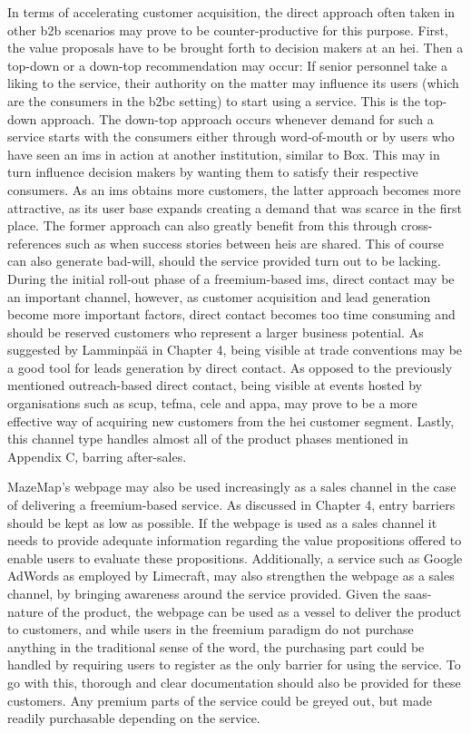In terms of accelerating customer acquisition, the direct approach often taken in other \gls{b2b} scenarios may prove to be counter-productive for this purpose. First, the value proposals have to be brought forth to decision makers at an \gls{hei}. Then a top-down or a down-top recommendation may occur: If senior personnel take a liking to the service, their authority on the matter may influence its users (which are the consumers in the \gls{b2bc} setting) to start using a service. This is the top-down approach. The down-top approach occurs whenever demand for such a service starts with the consumers either through word-of-mouth or by users who have seen an \gls{ims} in action at another institution, similar to Box. This may in turn influence decision makers by wanting them to satisfy their respective consumers. As an \gls{ims} obtains more customers, the latter approach becomes more attractive, as its user base expands creating a demand that was scarce in the first place. The former approach can also greatly benefit from this through cross-references such as when success stories between \glspl{hei} are shared. This of course can also generate bad-will, should the service provided turn out to be lacking. During the initial roll-out phase of a freemium-based \gls{ims}, direct contact may be an important channel, however, as customer acquisition and lead generation become more important factors, direct contact becomes too time consuming and should be reserved customers who represent a larger business potential. As suggested by Lamminpää in Chapter 4, being visible at trade conventions may be a good tool for leads generation by direct contact. As opposed to the previously mentioned outreach-based direct contact, being visible at events hosted by organisations such as \gls{scup}, \gls{tefma}, \gls{cele} and \gls{appa}, may prove to be a more effective way of acquiring new customers from the \gls{hei} customer segment. Lastly, this channel type handles almost all of the product phases mentioned in Appendix C, barring after-sales.


MazeMap's webpage may also be used increasingly as a sales channel in the case of delivering a freemium-based service. As discussed in Chapter 4, entry barriers should be kept as low as possible. If the webpage is used as a sales channel it needs to provide adequate information regarding the value propositions offered to enable users to evaluate these propositions. Additionally, a service such as Google AdWords as employed by Limecraft, may also strengthen the webpage as a sales channel, by bringing awareness around the service provided. Given the \gls{saas}-nature of the product, the webpage can be used as a vessel to deliver the product to customers, and while users in the freemium paradigm do not purchase anything in the traditional sense of the word, the purchasing part could be handled by requiring users to register as the only barrier for using the service. To go with this, thorough and clear documentation should also be provided for these customers. Any premium parts of the service could be greyed out, but made readily purchasable depending on the service. 



